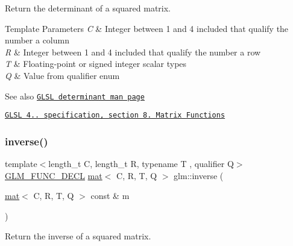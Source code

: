 Return the determinant of a squared matrix.


\begin{DoxyTemplParams}{Template Parameters}
{\em C} & Integer between 1 and 4 included that qualify the number a column \\
\hline
{\em R} & Integer between 1 and 4 included that qualify the number a row \\
\hline
{\em T} & Floating-\/point or signed integer scalar types \\
\hline
{\em Q} & Value from qualifier enum\\
\hline
\end{DoxyTemplParams}
\begin{DoxySeeAlso}{See also}
\href{http://www.opengl.org/sdk/docs/manglsl/xhtml/determinant.xml}{\tt G\+L\+SL determinant man page} 

\href{http://www.opengl.org/registry/doc/GLSLangSpec.4.20.8.pdf}{\tt G\+L\+SL 4.. specification, section 8. Matrix Functions} 
\end{DoxySeeAlso}
\mbox{\label{group__core__func__matrix_gace61e11fc177491beeca0c6971e2f3fc}} 
\subsubsection{\texorpdfstring{inverse()}{inverse()}}
{\footnotesize\ttfamily template$<$length\+\_\+t C, length\+\_\+t R, typename T , qualifier Q$>$ \\
\hyperlink{setup_8hpp_ab2d052de21a70539923e9bcbf6e83a51}{G\+L\+M\+\_\+\+F\+U\+N\+C\+\_\+\+D\+E\+CL} \hyperlink{structglm_1_1mat}{mat}$<$ C, R, T, Q $>$ glm\+::inverse (\begin{DoxyParamCaption}\item[{\hyperlink{structglm_1_1mat}{mat}$<$ C, R, T, Q $>$ const \&}]{m }\end{DoxyParamCaption})}

Return the inverse of a squared matrix.


